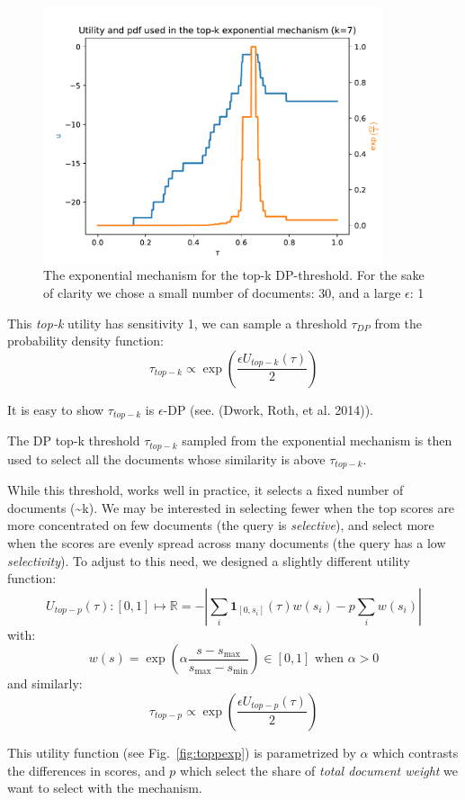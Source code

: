 \documentclass[
  12pt,
  a4paper,
]{article}
\begin{document}
\begin{figure}
\centering
\includegraphics[width=100mm,height=\textheight,keepaspectratio]{figures/top-k-exp.pdf}
\caption{The exponential mechanism for the top-k DP-threshold. For the
sake of clarity we chose a small number of documents: 30, and a large
\(\epsilon\): 1}\label{fig:topkexp}
\end{figure}

This \emph{top-k} utility has sensitivity 1, we can sample a threshold
\(\tau_{DP}\) from the probability density function:
\[\tau_{top-k}\propto\exp\left(\frac{\epsilon U_{top-k}(\tau)}{2}\right)\]

It is easy to show \(\tau_{top-k}\) is \(\epsilon\)-DP (see. (Dwork,
Roth, et al. 2014)).

The DP top-k threshold \(\tau_{top-k}\) sampled from the exponential
mechanism is then used to select all the documents whose similarity is
above \(\tau_{top-k}\).

While this threshold, works well in practice, it selects a fixed number
of documents (\textasciitilde k). We may be interested in selecting
fewer when the top scores are more concentrated on few documents (the
query is \emph{selective}), and select more when the scores are evenly
spread across many documents (the query has a low \emph{selectivity}).
To adjust to this need, we designed a slightly different utility
function:
\[U_{top-p}(\tau): [0, 1] \mapsto \mathbb{R} = -\left|\sum_i\mathbf{1}_{[0, s_i]}(\tau)w(s_i)-p\sum_i w(s_i)\right|\]
with:
\[w(s) = \exp\left(\alpha\frac{s-s_{\max}}{s_{\max}-s_{\min}}\right) \in [0, 1] \text{ when } \alpha>0\]
and similarly:
\[\tau_{top-p}\propto\exp\left(\frac{\epsilon U_{top-p}(\tau)}{2}\right)\]

This utility function (see Fig.~\ref{fig:toppexp}) is parametrized by
\(\alpha\) which contrasts the differences in scores, and \(p\) which
select the share of \emph{total document weight} we want to select with
the mechanism.
\end{document}
